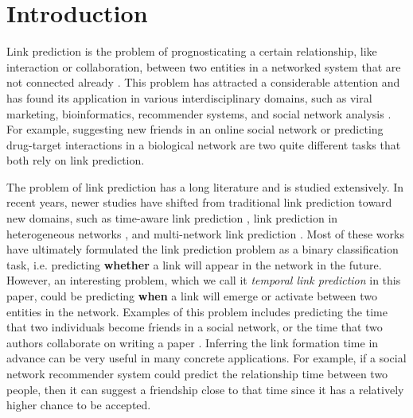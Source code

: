 \section{Introduction}\label{sec:intro}
Link prediction is the problem of prognosticating a certain relationship, like interaction or collaboration, between two entities in a networked system that are not connected already \cite{lu2011link}. This problem has attracted a considerable attention and has found its application in various interdisciplinary domains, such as viral marketing, bioinformatics, recommender systems, and social network analysis \cite{wasserman1994social}. For example, suggesting new friends in an online social network \cite{liben2007link} or predicting drug-target interactions in a biological network \cite{chen2012drug} are two quite different tasks that both rely on link prediction.

The problem of link prediction has a long literature and is studied extensively. In recent years, newer studies have shifted from traditional link prediction toward new domains, such as time-aware link prediction \cite{dhote2013survey}, link prediction in heterogeneous networks \cite{shi2017survey}, and multi-network link prediction \cite{kivela2014multilayer}. Most of these works have ultimately formulated the link prediction problem as a binary classification task, i.e. predicting \textbf{whether} a link will appear in the network in the future. However, an interesting problem, which we call it \emph{temporal link prediction} in this paper, could be predicting \textbf{when} a link will emerge or activate between two entities in the network. Examples of this problem includes predicting the time that two individuals become friends in a social network, or the time that two authors collaborate on writing a paper \cite{sun2012will}. Inferring the link formation time in advance can be very useful in many concrete applications. For example, if a social network recommender system could predict the relationship time between two people, then it can suggest a friendship close to that time since it has a relatively higher chance to be accepted.

%

